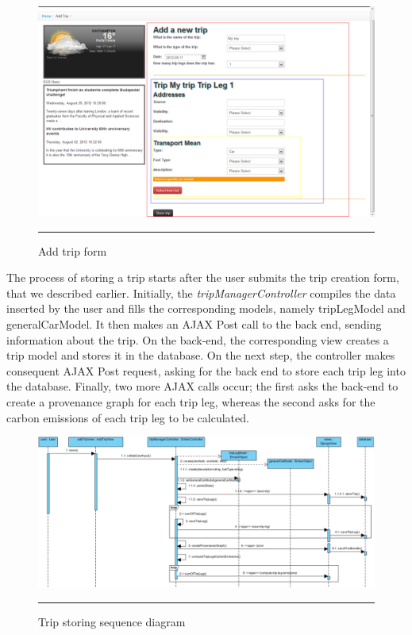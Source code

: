 \begin{figure}[htbp]
	\centering
		\includegraphics[scale=0.40]{./Figures/chapter4/figure12.pdf}
		\rule{35em}{0.5pt}
	\caption[Add trip from]{Add trip form}
	\label{fig:addTripForm}
\end{figure}

The process of storing a trip starts after the user submits the trip creation form, that we described earlier. Initially, the \emph{tripManagerController} compiles the data inserted by the user and fills the corresponding models, namely tripLegModel and generalCarModel. It then makes an AJAX Post call to the back end, sending information about the trip. On the back-end, the corresponding view creates a trip model and stores it in the database. On the next step, the controller makes consequent AJAX Post request, asking for the back end to store each trip leg into the database. Finally, two more AJAX calls occur; the first asks the back-end to create a provenance graph for each trip leg, whereas the second asks for the carbon emissions of each trip leg to be calculated.

\begin{landscape}
\begin{figure}[htbp]
	\centering
		\includegraphics[scale=0.55]{./Figures/chapter4/figure13.pdf}
		\rule{35em}{0.5pt}
	\caption[Trip storing sequence diagram]{Trip storing sequence diagram}
	\label{fig:tripStoreSeqDiagram}
\end{figure}
\end{landscape}

